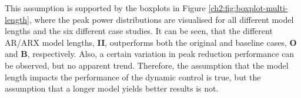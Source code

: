 

This assumption is supported by the boxplots in Figure \ref{ch2:fig:boxplot-multi-length}, where the peak power distributions are visualised for all different model lengths and the six different case studies.
It can be seen, that the different AR/ARX model lengths, \textbf{II}, outperforms both the original and baseline cases, \textbf{O} and \textbf{B}, respectively.
Also, a certain variation in peak reduction performance can be observed, but no apparent trend.
Therefore, the assumption that the model length impacts the performance of the dynamic control is true, but the assumption that a longer model yields better results is not.



